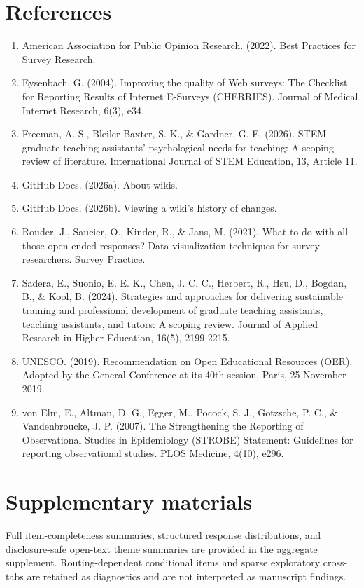 \documentclass[11pt]{article}
\begin{document}
\section*{References}
\begin{sloppypar}
\small
\begin{enumerate}
\item American Association for Public Opinion Research. (2022). Best Practices for Survey Research.
\item Eysenbach, G. (2004). Improving the quality of Web surveys: The Checklist for Reporting Results of Internet E-Surveys (CHERRIES). Journal of Medical Internet Research, 6(3), e34.
\item Freeman, A. S., Bleiler-Baxter, S. K., \& Gardner, G. E. (2026). STEM graduate teaching assistants' psychological needs for teaching: A scoping review of literature. International Journal of STEM Education, 13, Article 11.
\item GitHub Docs. (2026a). About wikis.
\item GitHub Docs. (2026b). Viewing a wiki's history of changes.
\item Rouder, J., Saucier, O., Kinder, R., \& Jans, M. (2021). What to do with all those open-ended responses? Data visualization techniques for survey researchers. Survey Practice.
\item Sadera, E., Suonio, E. E. K., Chen, J. C. C., Herbert, R., Hsu, D., Bogdan, B., \& Kool, B. (2024). Strategies and approaches for delivering sustainable training and professional development of graduate teaching assistants, teaching assistants, and tutors: A scoping review. Journal of Applied Research in Higher Education, 16(5), 2199-2215.
\item UNESCO. (2019). Recommendation on Open Educational Resources (OER). Adopted by the General Conference at its 40th session, Paris, 25 November 2019.
\item von Elm, E., Altman, D. G., Egger, M., Pocock, S. J., Gotzsche, P. C., \& Vandenbroucke, J. P. (2007). The Strengthening the Reporting of Observational Studies in Epidemiology (STROBE) Statement: Guidelines for reporting observational studies. PLOS Medicine, 4(10), e296.
\end{enumerate}
\normalsize
\end{sloppypar}
\section*{Supplementary materials}
Full item-completeness summaries, structured response distributions, and disclosure-safe open-text theme summaries are provided in the aggregate supplement. Routing-dependent conditional items and sparse exploratory cross-tabs are retained as diagnostics and are not interpreted as manuscript findings.
\end{document}
